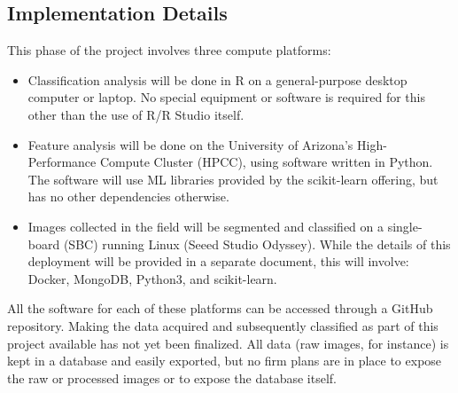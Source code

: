 \documentclass[12pt]{article}
\begin{document}
\subsection{Implementation Details}
This phase of the project involves three compute platforms:
\begin{itemize}
	\item{Classification analysis will be done in R on a general-purpose desktop computer or laptop. No special equipment or software is required for this other than the use of R/R Studio itself.}
	\item{Feature analysis will be done on the University of Arizona's High-Performance Compute Cluster (HPCC), using software written in Python. The software will use ML libraries provided by the scikit-learn offering, but has no other dependencies otherwise.}
	\item{Images collected in the field will be segmented and classified on a single-board (SBC) running Linux (Seeed Studio Odyssey). While the details of this deployment will be provided in a separate document, this will involve: Docker, MongoDB, Python3, and scikit-learn.}
\end{itemize}
All the software for each of these platforms can be accessed through a GitHub repository. Making the data acquired and subsequently classified as part of this project available has not yet been finalized. All data (raw images, for instance) is kept in a database and easily exported, but no  firm plans are in place to expose the raw or processed images or to expose the database itself.
\end{document}
